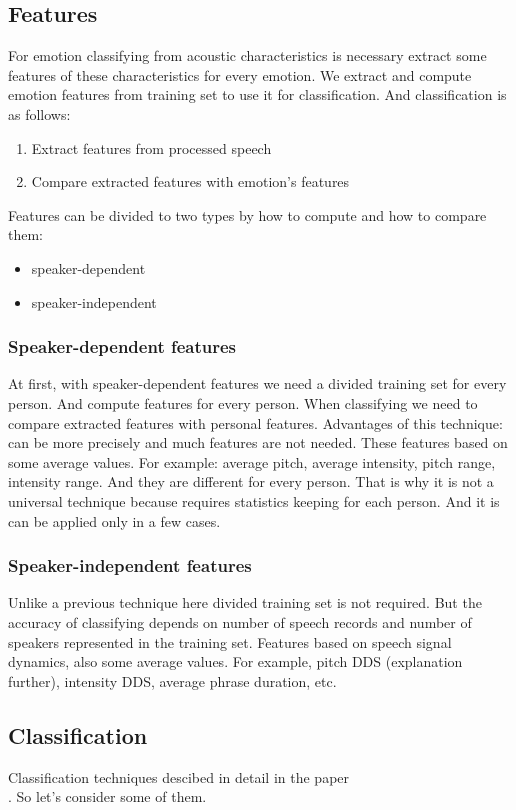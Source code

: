 \documentclass[12pt, letterpaper]{article}
\begin{document}
\subsection{Features}
For emotion classifying from acoustic characteristics is necessary extract some features of these characteristics for every emotion. We extract and compute emotion features from training set to use it for classification. And classification is as follows:
\begin{enumerate}
	\item Extract features from processed speech
	\item Compare extracted features with emotion's features
\end{enumerate}

Features can be divided to two types by how to compute and how to compare them:
\begin{itemize}
	\item speaker-dependent
	\item speaker-independent
\end{itemize}

\subsubsection{Speaker-dependent features}
At first, with speaker-dependent features we need a divided training set for every person. And compute features for every person. When classifying we need to compare extracted features with personal features. Advantages of this technique: can be more precisely and much features are not needed. These features based on some average values. For example: average pitch, average intensity, pitch range, intensity range. And they are different for every person. That is why it is not a universal technique because requires statistics keeping for each person. And it is can be applied only in a few cases.
\subsubsection{Speaker-independent features}
Unlike a previous technique here divided training set is not required. But the accuracy of classifying depends on number of speech records and number of speakers represented in the training set. Features based on speech signal dynamics, also some average values. For example, pitch DDS (explanation further), intensity DDS, average phrase duration, etc.


\subsection{Classification}%
Classification techniques descibed in detail in the paper\\ \cite{SirishaSirvinasSiva}. So let's consider some of them.
\end{document}
